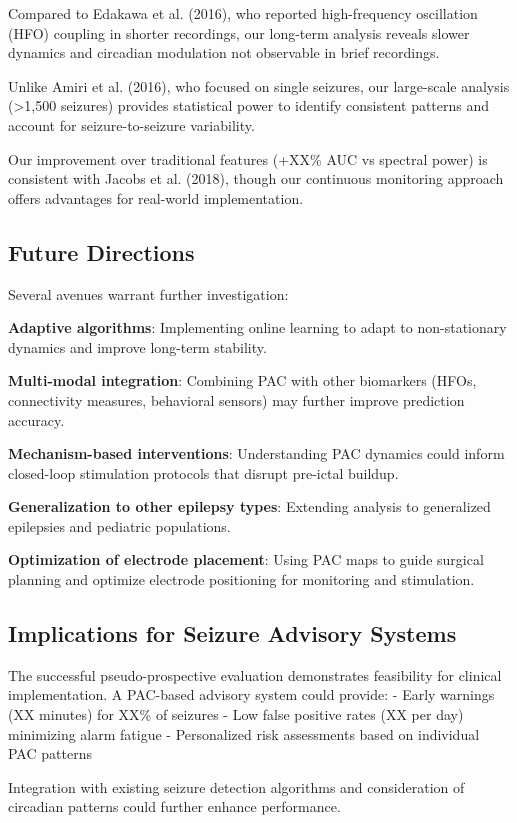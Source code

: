 Compared to Edakawa et al. (2016), who reported high-frequency oscillation (HFO) coupling in shorter recordings, our long-term analysis reveals slower dynamics and circadian modulation not observable in brief recordings.

Unlike Amiri et al. (2016), who focused on single seizures, our large-scale analysis (>1,500 seizures) provides statistical power to identify consistent patterns and account for seizure-to-seizure variability.

Our improvement over traditional features (+XX\% AUC vs spectral power) is consistent with Jacobs et al. (2018), though our continuous monitoring approach offers advantages for real-world implementation.

\subsection{Future Directions}

Several avenues warrant further investigation:

\textbf{Adaptive algorithms}: Implementing online learning to adapt to non-stationary dynamics and improve long-term stability.

\textbf{Multi-modal integration}: Combining PAC with other biomarkers (HFOs, connectivity measures, behavioral sensors) may further improve prediction accuracy.

\textbf{Mechanism-based interventions}: Understanding PAC dynamics could inform closed-loop stimulation protocols that disrupt pre-ictal buildup.

\textbf{Generalization to other epilepsy types}: Extending analysis to generalized epilepsies and pediatric populations.

\textbf{Optimization of electrode placement}: Using PAC maps to guide surgical planning and optimize electrode positioning for monitoring and stimulation.

\subsection{Implications for Seizure Advisory Systems}
The successful pseudo-prospective evaluation demonstrates feasibility for clinical implementation. A PAC-based advisory system could provide:
- Early warnings (XX minutes) for XX\% of seizures
- Low false positive rates (XX per day) minimizing alarm fatigue
- Personalized risk assessments based on individual PAC patterns

Integration with existing seizure detection algorithms and consideration of circadian patterns could further enhance performance.

